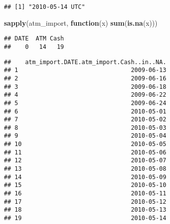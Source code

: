 \documentclass[
]{article}
\newenvironment{Shaded}{\begin{snugshade}}{\end{snugshade}}
\newcommand{\ConstantTok}[1]{\textcolor[rgb]{0.56,0.35,0.01}{#1}}
\newcommand{\ControlFlowTok}[1]{\textcolor[rgb]{0.13,0.29,0.53}{\textbf{#1}}}
\newcommand{\FunctionTok}[1]{\textcolor[rgb]{0.13,0.29,0.53}{\textbf{#1}}}
\newcommand{\NormalTok}[1]{#1}
\newcommand{\SpecialCharTok}[1]{\textcolor[rgb]{0.81,0.36,0.00}{\textbf{#1}}}
\begin{document}
\begin{verbatim}
## [1] "2010-05-14 UTC"
\end{verbatim}

\begin{Shaded}
\begin{Highlighting}[]
\FunctionTok{sapply}\NormalTok{(atm\_import, }\ControlFlowTok{function}\NormalTok{(x) }\FunctionTok{sum}\NormalTok{(}\FunctionTok{is.na}\NormalTok{(x)))}
\end{Highlighting}
\end{Shaded}

\begin{verbatim}
## DATE  ATM Cash 
##    0   14   19
\end{verbatim}

\begin{Shaded}
\end{Shaded}

\begin{verbatim}
##    atm_import.DATE.atm_import.Cash..in..NA.
## 1                                2009-06-13
## 2                                2009-06-16
## 3                                2009-06-18
## 4                                2009-06-22
## 5                                2009-06-24
## 6                                2010-05-01
## 7                                2010-05-02
## 8                                2010-05-03
## 9                                2010-05-04
## 10                               2010-05-05
## 11                               2010-05-06
## 12                               2010-05-07
## 13                               2010-05-08
## 14                               2010-05-09
## 15                               2010-05-10
## 16                               2010-05-11
## 17                               2010-05-12
## 18                               2010-05-13
## 19                               2010-05-14
\end{verbatim}
\end{document}
